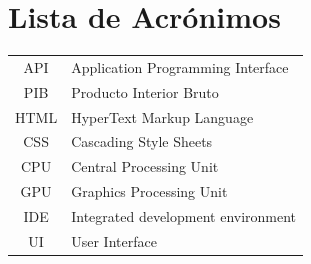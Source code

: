 \documentclass[12pt]{report} %
\begin{document}
\newpage %
\thispagestyle{empty}
\mbox{}


	
		
	
	


\tableofcontents
\thispagestyle{fancy}

\newpage %
\thispagestyle{empty}
\mbox{}

\listoffigures
\thispagestyle{fancy}

\newpage %
\thispagestyle{empty}
\mbox{}

\listoftables
\thispagestyle{fancy}

\newpage %
\thispagestyle{empty}
\mbox{}

\chapter*{Lista de Acrónimos}
\begin{center}
	\begin{tabular}{c p{8cm}} %
			API & Application Programming Interface \\
			PIB & Producto Interior Bruto \\
			HTML & HyperText Markup Language \\
			CSS & Cascading Style Sheets \\
			CPU & Central Processing Unit \\
			GPU & Graphics Processing Unit \\
			IDE & Integrated development environment \\
			UI & User Interface
	\end{tabular}
\end{center}
\end{document}
